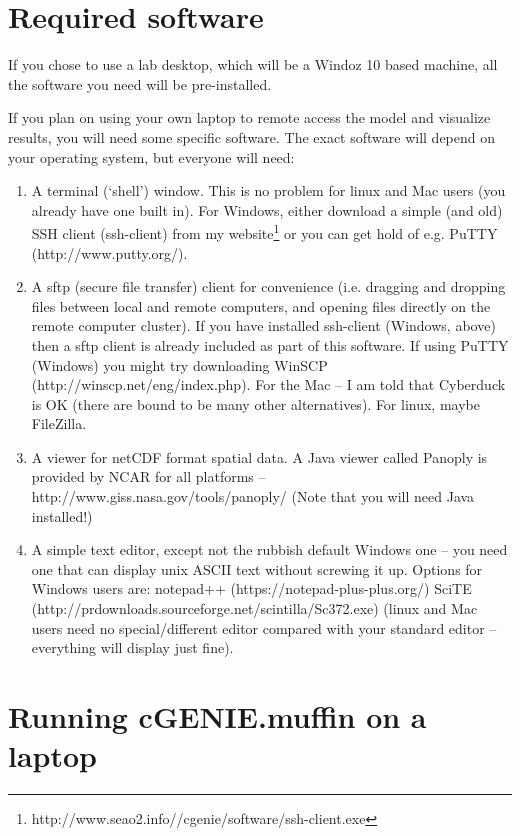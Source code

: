 \documentclass[11pt,fleqn]{book} %
\begin{document}
\section*{Required software}

If you chose to use a lab desktop, which will be a Windoz 10 based machine, all the software you need will be pre-installed.

If you plan on using your own laptop to remote access the model and visualize results, you will need some specific software. The exact software will depend on your operating system, but everyone will need:

\begin{enumerate}[noitemsep]
\setlength{\itemindent}{.2in}
\item A terminal (‘shell’) window. This is no problem for linux and Mac users (you already have one built in). For Windows, either download a simple (and old) SSH client (ssh-client) from my website\footnote{http://www.seao2.info//cgenie/software/ssh-client.exe} or you can get hold of e.g. PuTTY (http://www.putty.org/).
\item A sftp (secure file transfer) client for convenience (i.e. dragging and dropping files between local and remote computers, and opening files directly on the remote computer cluster). If you have installed ssh-client (Windows, above) then a sftp client is already included as part of this software. If using PuTTY (Windows) you might try downloading WinSCP (http://winscp.net/eng/index.php). For the Mac – I am told that Cyberduck is OK (there are bound to be many other alternatives). For linux, maybe FileZilla.
\item A viewer for netCDF format spatial data. A Java viewer called Panoply is provided by NCAR for all platforms – http://www.giss.nasa.gov/tools/panoply/
(Note that you will need Java installed!)
\item  A simple text editor, except not the rubbish default Windows one – you need one that can display unix ASCII text without screwing it up. Options for Windows users are:
notepad++ (https://notepad-plus-plus.org/)
SciTE (http://prdownloads.sourceforge.net/scintilla/Sc372.exe)
(linux and Mac users need no special/different editor compared with your standard editor – everything will display just fine).
\end{enumerate}


\section*{Running cGENIE.muffin on a laptop}
\end{document}
